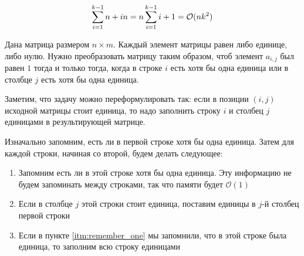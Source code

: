 \documentclass[addpoints]{exam}
\begin{document}
\begin{questions}
\begin{solution}
$$\sum\limits_{i=1}^{k-1} {n + in} = n \sum\limits_{i=1}^{k-1} {i + 1} = \mathcal{O}(n k^2)$$

\end{solution}

\question Дана матрица размером $n \times m$. Каждый элемент матрицы равен либо единице, либо нулю. Нужно преобразовать матрицу таким образом, чтоб элемент $a_{i,j}$ был равен $1$ тогда и только тогда, когда в строке $i$ есть хотя бы одна единица или в столбце $j$ есть хотя бы одна единица. 


\begin{solution}

Заметим, что задачу можно переформулировать так: если в позиции $(i,j)$ исходной матрицы стоит единица, то надо заполнить строку $i$ и столбец $j$ единицами в результирующей матрице.

Изначально запомним, есть ли в первой строке хотя бы одна единица. Затем для каждой строки, начиная со второй, будем делать следующее:

\begin{enumerate}

\item \label{itm:remember_one} Запомним есть ли в этой строке хотя бы одна единица. Эту информацию не будем запоминать между строками, так что памяти будет $\mathcal{O}(1)$

\item Если в столбце $j$ этой строки стоит единица, поставим единицы в $j$-й столбец первой строки

\item Если в пункте \ref{itm:remember_one} мы запомнили, что в этой строке была единица, то заполним всю строку единицами


\end{enumerate}
\end{solution}
\end{questions}
\end{document}
